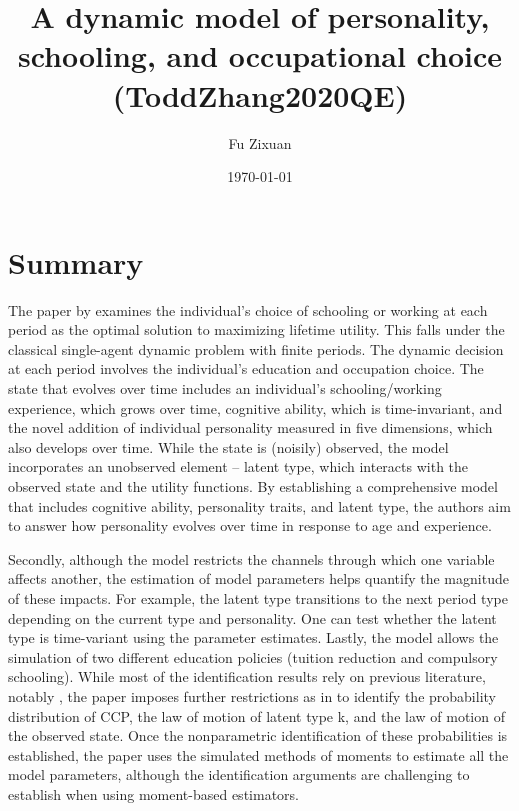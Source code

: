 \documentclass[10pt]{article}
\title{A dynamic model of personality, schooling, and occupational choice (ToddZhang2020QE)}
\author{Fu Zixuan}
\date{\today}
\begin{document}
\maketitle




\section{Summary}
The paper by \citet{todd2020dynamic} examines the individual's choice of schooling or working at each period as the optimal solution to maximizing lifetime utility. This falls under the classical single-agent dynamic problem with finite periods. The dynamic decision at each period involves the individual's education and occupation choice. The state that evolves over time includes an individual's schooling/working experience, which grows over time, cognitive ability, which is time-invariant, and the novel addition of individual personality measured in five dimensions, which also develops over time. While the state is (noisily) observed, the model incorporates an unobserved element -- latent type, which interacts with the observed state and the utility functions. By establishing a comprehensive model that includes cognitive ability, personality traits, and latent type, the authors aim to answer how personality evolves over time in response to age and experience. 

Secondly, although the model restricts the channels through which one variable affects another, the estimation of model parameters helps quantify the magnitude of these impacts. For example, the latent type transitions to the next period type depending on the current type and personality. One can test whether the latent type is time-variant using the parameter estimates. Lastly, the model allows the simulation of two different education policies (tuition reduction and compulsory schooling). While most of the identification results rely on previous literature, notably \cite{hu2012nonparametric}, the paper imposes further restrictions as in \citet{hu2017simple} to identify the probability distribution of CCP, the law of motion of latent type k, and the law of motion of the observed state. Once the nonparametric identification of these probabilities is established, the paper uses the simulated methods of moments to estimate all the model parameters, although the identification arguments are challenging to establish when using moment-based estimators.
\end{document}
